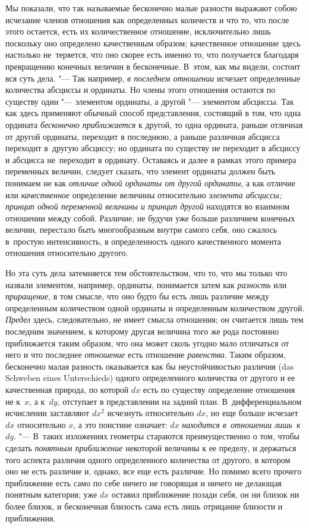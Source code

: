 Мы показали, что так называемые бесконечно малые разности выражают собою
исчезание членов отношения как определенных количеств и что то, что после этого
остается, есть их количественное отношение, исключительно лишь поскольку оно
определено качественным образом; качественное отношение здесь настолько
не~теряется, что оно скорее есть именно то, что получается благодаря
превращению конечных величин в бесконечные. В~этом, как мы видели, состоит вся
суть дела. "--- Так например, {\em в последнем отношении} исчезает определенные
количества абсциссы и ординаты. Но члены этого отношения остаются по существу
один "--- элементом ординаты, а другой "--- элементом абсциссы. Так как здесь
применяют обычный способ представления, состоящий в том, что одна ордината
{\em бесконечно приближается} к другой, то одна ордината, раньше отличная от
другой ординаты, переходит в последнюю, а раньше различная абсцисса переходит
в~другую абсциссу; но ордината по существу не переходит в абсциссу и абсцисса
не~переходит в ординату. Оставаясь и далее в рамках этого примера переменных
величин, следует сказать, что элемент ординаты должен быть понимаем не как
{\em отличие одной ординаты от другой ординаты}, а как отличие или
{\em качественное} определение величины относительно {\em элемента абсциссы;}
{\em принцип одной переменной величины и принцип другой} находятся во взаимном
отношении между собой. Различие, не будучи уже больше различием конечных
величин, перестало быть многообразным внутри самого себя, оно сжалось в~простую
интенсивность, в определенность одного качественного момента отношения
относительно другого.

Но эта суть дела затемняется тем обстоятельством, что то, что мы только что
назвали элементом, например, ординаты, понимается затем как {\em разность} или
{\em приращение}, в том смысле, что оно будто бы есть лишь различие между
определенным количеством одной ординаты и определенным количеством другой.
{\em Предел} здесь, следовательно, не имеет смысла отношения; он считается лишь
тем последним значением, к которому другая величина того же рода постоянно
приближается таким образом, что она может сколь угодно мало отличаться от него
и что последнее {\em отношение} есть отношение {\em равенства}. Таким образом,
бесконечно малая разность оказывается как бы неустойчивостью различия (das
Schweben eines Unter\-schieds) одного определенного количества от другого и ее
качественная природа, по которой $dx$ есть по существу определение отношения не
к~$x$, а к~$dy$, отступает в представлении на задний план. В~дифференциальном
исчислении заставляют $dx^2$ исчезнуть относительно $dx$, но еще больше
исчезает $dx$ относительно $x$, а это поистине означает: $dx$
{\em находится в~отношении лишь~к}~$dy$. "--- В~таких изложениях геометры
стараются преимущественно о том, чтобы сделать {\em понятным приближение}
некоторой величины к ее пределу, и держаться того аспекта различия одного
определенного количества от другого, в котором оно не есть различие и, однако,
все еще есть различие. Но помимо всего прочего приближение есть само по себе
ничего не говорящая и ничего не делающая понятным категория; уже $dx$ оставил
приближение позади себя, он ни близок ни более близок, и бесконечная близость
сама есть лишь отрицание близости и приближения.

